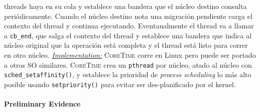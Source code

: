 threads haya en su cola y establece una bandera que el núcleo destino consulta periódicamente. Cuando el núcleo destino nota una migración pendiente carga el contexto del thread y continua ejecutando. Eventaualmente el thread va a llamar a \texttt{cb\_end}, que salga el contexto del thread y establece una bandera que indica al núcleo original que la operación está completa y el thread está listo para correr en otro núcleo. \underline{\emph{Implementation:}} \textsc{CoreTime} corre en Linux pero puede ser portado a otros SO similares. \textsc{CoreTime} crea un \texttt{pthread} por núcleo, atado al núcleo con \texttt{sched\_setaffinity()}, y establece la prioridad de \emph{process scheduling} lo más alto posible usando \texttt{setpriority()} para evitar ser des-planificado por el kernel.

\paragraph{\textnormal{\textbf{Preliminary Evidence}}}
